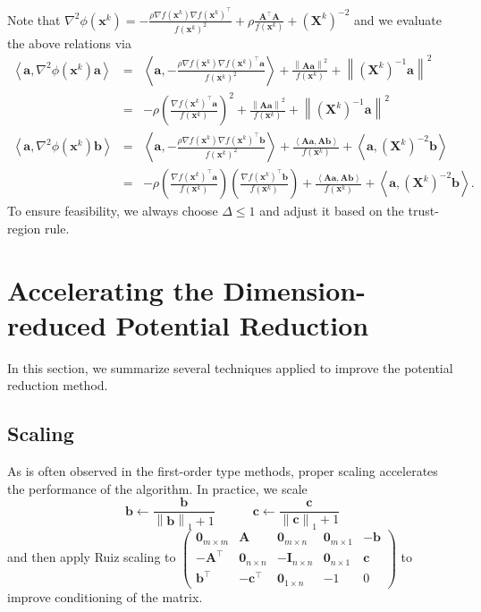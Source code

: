 \documentclass{article}
\newcommand{\x}{\mathbf{x}}
\newcommand{\A}{\mathbf{A}}
\newcommand{\0}{\textbf{0}}
\newcommand{\n}{\nabla}
\newcommand{\X}{\mathbf{X}}
\newcommand{\I}{\mathbf{I}}
\newcommand{\tma}{\mathbf{a}}
\newcommand{\tmb}{\mathbf{b}}
\newcommand{\tmc}{\mathbf{c}}
\begin{document}
Note that $\nabla^2 \phi \left( \x^k \right) = - \frac{\rho \n f \left( \x^k
\right) \n f \left( \x^k \right)^{\top}}{f \left( \x^k \right)^2} + \rho
\frac{\A^{\top} \A}{f \left( \x^k \right)} + \left( \X^k \right)^{- 2}$ and we
evaluate the above relations via
\begin{eqnarray*}
  \left\langle \tma, \nabla^2 \phi \left( \x^k \right) \tma \right\rangle & =
  & \left\langle \tma, - \frac{\rho \n f \left( \x^k \right) \n f \left( \x^k
  \right)^{\top} \tma}{f \left( \x^k \right)^2} \right\rangle + \frac{\left\|
  \A \tma \right\|^2}{f \left( \x^k \right)} + \left\| \left( \X^k \right)^{-
  1} \tma \right\|^2\\
  & = & - \rho \left( \frac{\n f \left( \x^k \right)^{\top} \tma}{f \left(
  \x^k \right)} \right)^2 + \frac{\left\| \A \tma \right\|^2}{f \left( \x^k
  \right)} + \left\| \left( \X^k \right)^{- 1} \tma \right\|^2\\
  \left\langle \tma, \nabla^2 \phi \left( \x^k \right) \tmb \right\rangle & =
  & \left\langle \tma, - \frac{\rho \n f \left( \x^k \right) \n f \left( \x^k
  \right)^{\top} \tmb}{f \left( \x^k \right)^2} \right\rangle +
  \frac{\left\langle \A \tma, \A \tmb \right\rangle}{f \left( \x^k \right)} +
  \left\langle \tma, \left( \X^k \right)^{- 2} \tmb \right\rangle\\
  & = & - \rho \left( \frac{\n f \left( \x^k \right)^{\top} \tma}{f \left(
  \x^k \right)} \right) \left( \frac{\n f \left( \x^k \right)^{\top} \tmb}{f
  \left( \x^k \right)} \right) + \frac{\left\langle \A \tma, \A \tmb
  \right\rangle}{f \left( \x^k \right)} + \left\langle \tma, \left( \X^k
  \right)^{- 2} \tmb \right\rangle .
\end{eqnarray*}
To ensure feasibility, we always choose $\Delta \leq 1$ and adjust it based on
the trust-region rule.

\section{Accelerating the Dimension-reduced Potential Reduction}

In this section, we summarize several techniques applied to improve the
potential reduction method.

\subsection{Scaling}

As is often observed in the first-order type methods, proper scaling
accelerates the performance of the algorithm. In practice, we scale
\[ \tmb \leftarrow \frac{\tmb}{\left\| \tmb \right\|_1 + 1} \hspace{3em} \tmc
   \leftarrow \frac{\tmc}{\left\| \tmc \right\|_1 + 1} \]
and then apply Ruiz scaling {\cite{ruiz2001scaling}} to
$\left(\begin{array}{ccccc}
  \0_{m \times m} & \A & \0_{m \times n} & \0_{m \times 1} & - \tmb\\
  - \A^{\top} & \0_{n \times n} & - \I_{n \times n} & \0_{n \times 1} & \tmc\\
  \tmb^{\top} & - \tmc^{\top} & \0_{1 \times n} & - 1 & 0
\end{array}\right)$ to improve conditioning of the matrix.
\end{document}
